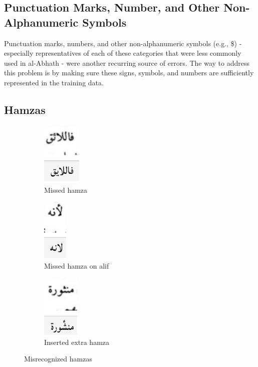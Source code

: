 \subsection{Punctuation Marks, Number, and Other Non-Alphanumeric Symbols}

Punctuation marks, numbers, and other non-alphanumeric symbols (e.g.,
\$) - especially representatives of each of these categories that were less
commonly used in al-Abhath - were another recurring source of errors. The way to
address this problem is by making sure these signs, symbols, and numbers are
sufficiently represented in the training data.

\subsection{Hamzas}

\begin{figure}[H]
	\centering
	\begin{subfigure}[t]{0.3\linewidth}
	\centering
	\includegraphics[height=3cm]{images/image28.png}
	\caption{Missed hamza}
	\label{fig3:fig18}
	\end{subfigure}
	\begin{subfigure}[t]{0.3\linewidth}
	\centering
	\includegraphics[height=3cm]{images/image29.png}
	\caption{Missed hamza on alif}
	\label{fig3:fig19}
	\end{subfigure}
	\begin{subfigure}[t]{0.3\linewidth}
	\centering
	\includegraphics[height=3cm]{images/image30.png}
	\caption{Inserted extra hamza}
	\label{fig3:fig20}
	\end{subfigure}
	\caption{Misrecognized hamzas}
	\label{fig3:fig1820}
\end{figure}

